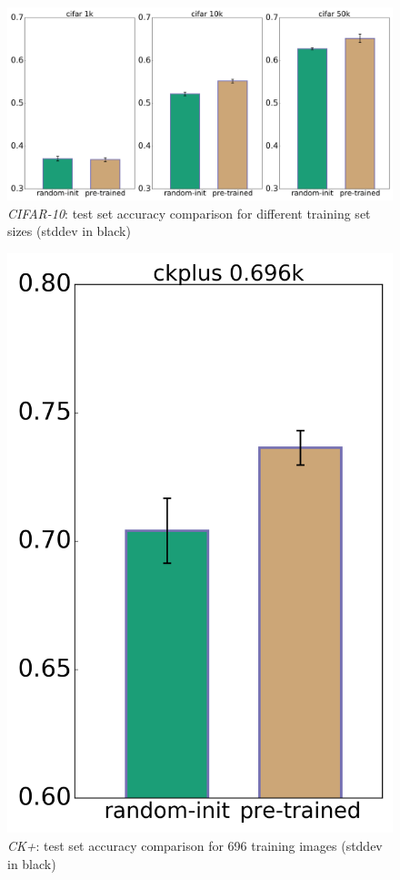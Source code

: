 \documentclass[draft]{article}
\begin{document}
    \begin{figure}
      \includegraphics[width=\linewidth]{../box_plots/boxplots_cifar.png}
      \caption{\emph{CIFAR-10}: test set accuracy comparison for different training set sizes (stddev in black)}
      \label{fig:cifar_plot}
    \end{figure}

    \begin{figure}
      \centering
      \includegraphics[width=0.33\linewidth]{../box_plots/boxplots_ckplus.png}
      \caption{\emph{CK+}: test set accuracy comparison for 696 training images (stddev in black)}
      \label{fig:ckplus_plot}
    \end{figure}
\end{document}
